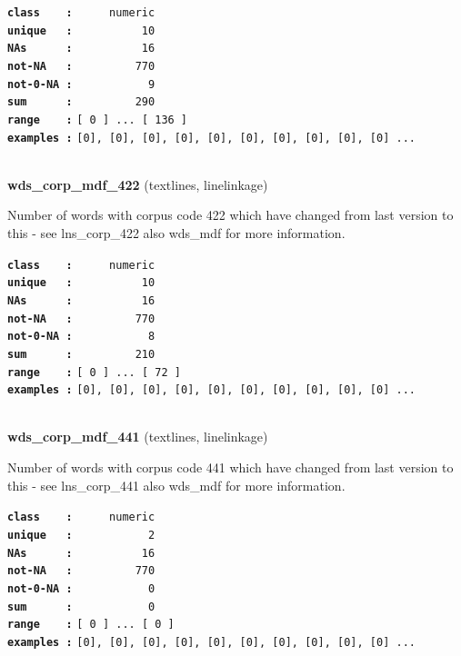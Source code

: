 \documentclass[]{article}
\begin{document}
\textbf{\texttt{class\ \ \ \ :}} \texttt{~~~~~numeric}\\
\textbf{\texttt{unique\ \ \ :}} \texttt{~~~~~~~~~~10}\\
\textbf{\texttt{NAs\ \ \ \ \ \ :}} \texttt{~~~~~~~~~~16}\\
\textbf{\texttt{not-NA\ \ \ :}} \texttt{~~~~~~~~~770}\\
\textbf{\texttt{not-0-NA\ :}} \texttt{~~~~~~~~~~~9}\\
\textbf{\texttt{sum\ \ \ \ \ \ :}} \texttt{~~~~~~~~~290}\\
\textbf{\texttt{range\ \ \ \ :}}
\texttt{{[}\ 0\ {]}\ ...\ {[}\ 136\ {]}}\\
\textbf{\texttt{examples\ :}}
\texttt{{[}0{]},\ {[}0{]},\ {[}0{]},\ {[}0{]},\ {[}0{]},\ {[}0{]},\ {[}0{]},\ {[}0{]},\ {[}0{]},\ {[}0{]}\ ...}\\

~

\textbf{wds\_corp\_mdf\_422} (textlines, linelinkage)

Number of words with corpus code 422 which have changed from last
version to this - see lns\_corp\_422 also wds\_mdf for more information.

\textbf{\texttt{class\ \ \ \ :}} \texttt{~~~~~numeric}\\
\textbf{\texttt{unique\ \ \ :}} \texttt{~~~~~~~~~~10}\\
\textbf{\texttt{NAs\ \ \ \ \ \ :}} \texttt{~~~~~~~~~~16}\\
\textbf{\texttt{not-NA\ \ \ :}} \texttt{~~~~~~~~~770}\\
\textbf{\texttt{not-0-NA\ :}} \texttt{~~~~~~~~~~~8}\\
\textbf{\texttt{sum\ \ \ \ \ \ :}} \texttt{~~~~~~~~~210}\\
\textbf{\texttt{range\ \ \ \ :}}
\texttt{{[}\ 0\ {]}\ ...\ {[}\ 72\ {]}}\\
\textbf{\texttt{examples\ :}}
\texttt{{[}0{]},\ {[}0{]},\ {[}0{]},\ {[}0{]},\ {[}0{]},\ {[}0{]},\ {[}0{]},\ {[}0{]},\ {[}0{]},\ {[}0{]}\ ...}\\

~

\textbf{wds\_corp\_mdf\_441} (textlines, linelinkage)

Number of words with corpus code 441 which have changed from last
version to this - see lns\_corp\_441 also wds\_mdf for more information.

\textbf{\texttt{class\ \ \ \ :}} \texttt{~~~~~numeric}\\
\textbf{\texttt{unique\ \ \ :}} \texttt{~~~~~~~~~~~2}\\
\textbf{\texttt{NAs\ \ \ \ \ \ :}} \texttt{~~~~~~~~~~16}\\
\textbf{\texttt{not-NA\ \ \ :}} \texttt{~~~~~~~~~770}\\
\textbf{\texttt{not-0-NA\ :}} \texttt{~~~~~~~~~~~0}\\
\textbf{\texttt{sum\ \ \ \ \ \ :}} \texttt{~~~~~~~~~~~0}\\
\textbf{\texttt{range\ \ \ \ :}}
\texttt{{[}\ 0\ {]}\ ...\ {[}\ 0\ {]}}\\
\textbf{\texttt{examples\ :}}
\texttt{{[}0{]},\ {[}0{]},\ {[}0{]},\ {[}0{]},\ {[}0{]},\ {[}0{]},\ {[}0{]},\ {[}0{]},\ {[}0{]},\ {[}0{]}\ ...}\\
\end{document}
